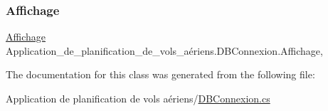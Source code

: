 \subsubsection{\texorpdfstring{Affichage}{Affichage}}
{\footnotesize\ttfamily \hyperlink{class_application__de__planification__de__vols__a_xC3_xA9riens_1_1_affichage}{Affichage} Application\+\_\+de\+\_\+planification\+\_\+de\+\_\+vols\+\_\+aériens.\+D\+B\+Connexion.\+Affichage\hspace{0.3cm}{\ttfamily [get]}, {\ttfamily [set]}}



The documentation for this class was generated from the following file\+:\begin{DoxyCompactItemize}
\item 
Application de planification de vols aériens/\hyperlink{_d_b_connexion_8cs}{D\+B\+Connexion.\+cs}\end{DoxyCompactItemize}
